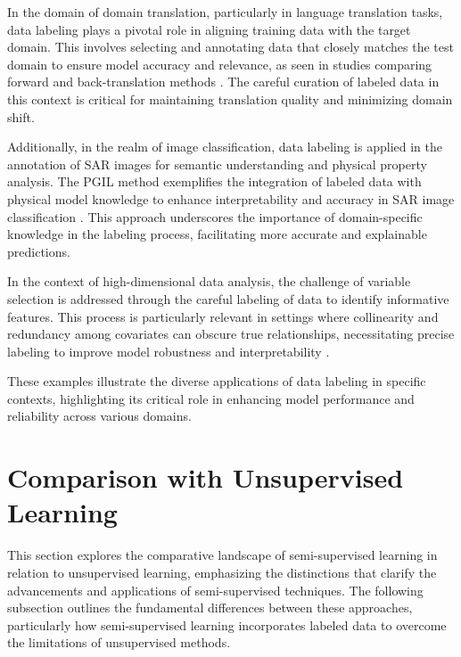 In the domain of domain translation, particularly in language translation tasks, data labeling plays a pivotal role in aligning training data with the target domain. This involves selecting and annotating data that closely matches the test domain to ensure model accuracy and relevance, as seen in studies comparing forward and back-translation methods \cite{bogoychev2020domaintranslationesenoisesynthetic}. The careful curation of labeled data in this context is critical for maintaining translation quality and minimizing domain shift.



Additionally, in the realm of image classification, data labeling is applied in the annotation of SAR images for semantic understanding and physical property analysis. The PGIL method exemplifies the integration of labeled data with physical model knowledge to enhance interpretability and accuracy in SAR image classification \cite{huang2022physicallyexplainablecnnsar}. This approach underscores the importance of domain-specific knowledge in the labeling process, facilitating more accurate and explainable predictions.



In the context of high-dimensional data analysis, the challenge of variable selection is addressed through the careful labeling of data to identify informative features. This process is particularly relevant in settings where collinearity and redundancy among covariates can obscure true relationships, necessitating precise labeling to improve model robustness and interpretability \cite{williams2018nonpenalizedvariableselectionhighdimensional}.



These examples illustrate the diverse applications of data labeling in specific contexts, highlighting its critical role in enhancing model performance and reliability across various domains.













\section{Comparison with Unsupervised Learning} \label{sec:Comparison with Unsupervised Learning}

This section explores the comparative landscape of semi-supervised learning in relation to unsupervised learning, emphasizing the distinctions that clarify the advancements and applications of semi-supervised techniques. The following subsection outlines the fundamental differences between these approaches, particularly how semi-supervised learning incorporates labeled data to overcome the limitations of unsupervised methods.


